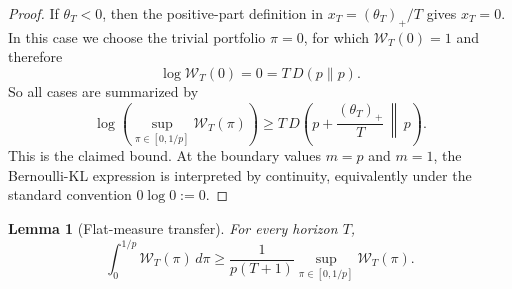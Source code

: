 \documentclass[11pt]{article}
\newtheorem{lemma}{Lemma}
\newcommand{\1}{\mathbf{1}}
\begin{document}
\begin{proof}
If $\theta_T<0$, then the positive-part definition in $x_T=(\theta_T)_+/T$ gives $x_T=0$. In this case we choose the trivial portfolio $\pi=0$, for which $\mathcal W_T(0)=1$ and therefore
\[
\log \mathcal W_T(0)=0=T\,D(p\|p).
\]
So all cases are summarized by
\[
\log\!\left(\sup_{\pi\in[0,1/p]} \mathcal W_T(\pi)\right)
\ge
T\,D\!\left(p+\frac{(\theta_T)_+}{T}\,\middle\|\,p\right).
\]
This is the claimed bound. At the boundary values $m=p$ and $m=1$, the Bernoulli-KL expression is interpreted by continuity, equivalently under the standard convention $0\log 0:=0$.
\end{proof}

\begin{lemma}[Flat-measure transfer]
\label{lem:app-flat-transfer}
For every horizon \(T\),
\[
\int_0^{1/p}\mathcal W_T(\pi)\,d\pi
\ge
\frac{1}{p(T+1)}
\sup_{\pi\in[0,1/p]}\mathcal W_T(\pi).
\]
\end{lemma}
\end{document}

